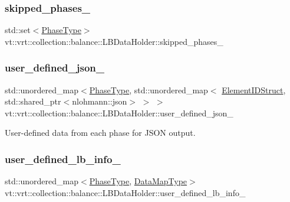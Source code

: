 \subsubsection{\texorpdfstring{skipped\+\_\+phases\+\_\+}{skipped\_phases\_}}
{\footnotesize\ttfamily std\+::set$<$\hyperlink{namespacevt_a46ce6733d5cdbd735d561b7b4029f6d7}{Phase\+Type}$>$ vt\+::vrt\+::collection\+::balance\+::\+L\+B\+Data\+Holder\+::skipped\+\_\+phases\+\_\+}

\mbox{\label{structvt_1_1vrt_1_1collection_1_1balance_1_1_l_b_data_holder_a38dc8aada18756357212f4229ea363da}} 
\subsubsection{\texorpdfstring{user\+\_\+defined\+\_\+json\+\_\+}{user\_defined\_json\_}}
{\footnotesize\ttfamily std\+::unordered\+\_\+map$<$\hyperlink{namespacevt_a46ce6733d5cdbd735d561b7b4029f6d7}{Phase\+Type}, std\+::unordered\+\_\+map$<$ \hyperlink{namespacevt_1_1vrt_1_1collection_1_1balance_a9f5b53fafb270212279a4757d2c4cd28}{Element\+I\+D\+Struct}, std\+::shared\+\_\+ptr$<$nlohmann\+::json$>$ $>$ $>$ vt\+::vrt\+::collection\+::balance\+::\+L\+B\+Data\+Holder\+::user\+\_\+defined\+\_\+json\+\_\+}



User-\/defined data from each phase for J\+S\+ON output. 

\mbox{\label{structvt_1_1vrt_1_1collection_1_1balance_1_1_l_b_data_holder_ad5b8a5a6093c4edd34a10069551c1d19}} 
\subsubsection{\texorpdfstring{user\+\_\+defined\+\_\+lb\+\_\+info\+\_\+}{user\_defined\_lb\_info\_}}
{\footnotesize\ttfamily std\+::unordered\+\_\+map$<$\hyperlink{namespacevt_a46ce6733d5cdbd735d561b7b4029f6d7}{Phase\+Type}, \hyperlink{namespacevt_1_1vrt_1_1collection_1_1balance_acf152c668ed9e2e9c6b29784181d2435}{Data\+Map\+Type}$>$ vt\+::vrt\+::collection\+::balance\+::\+L\+B\+Data\+Holder\+::user\+\_\+defined\+\_\+lb\+\_\+info\+\_\+}



